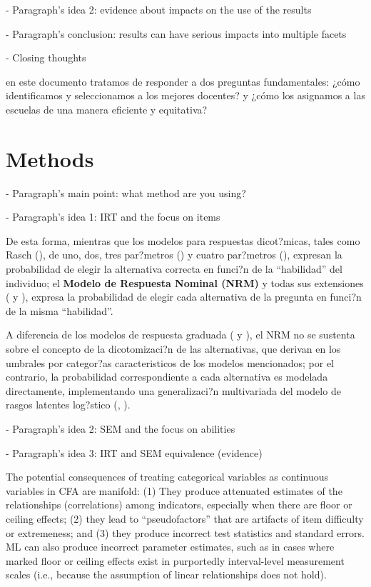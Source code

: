 - Paragraph's idea 2: evidence about impacts on the use of the results


- Paragraph's conclusion: results can have serious impacts into multiple facets




- Closing thoughts

en este documento tratamos de responder a dos preguntas fundamentales: ¿cómo identificamos y seleccionamos a los mejores docentes? y ¿cómo los asignamos a las escuelas de una manera eficiente y equitativa? \citep{Bertoni_et_al_2020b}



\section{Methods}

- Paragraph's main point: what method are you using?


- Paragraph's idea 1: IRT and the focus on items

De esta forma, mientras que los modelos para respuestas dicot?micas, tales como Rasch (\citealp{Rasch1980}), de uno, dos, tres par?metros (\citealp{Lord_Nov2008}) y cuatro par?metros (\citealp{McDonald1967}), expresan la probabilidad de elegir la alternativa correcta en funci?n de la ``habilidad'' del individuo; el \textbf{Modelo de Respuesta Nominal (NRM)} y todas sus extensiones (\citealt{Bock1972}  y \citealt[cap?tulo 2]{Linden1997}), expresa la probabilidad de elegir cada alternativa de la pregunta en funci?n de la misma ``habilidad''.

A diferencia de los modelos de respuesta graduada (\citealt{Samejima1969, Samejima1972} y \citealt[cap?tulo 5]{Ham_Swam1991}), el NRM no se sustenta sobre el concepto de la dicotomizaci?n de las alternativas, que derivan en los umbrales por categor?as caracteristicos de los modelos mencionados; por el contrario, la probabilidad correspondiente a cada alternativa es modelada directamente, implementando una generalizaci?n multivariada del modelo de rasgos latentes log?stico (\citealt{Bock1972}, \citealt{Ostini2006}).



- Paragraph's idea 2: SEM and the focus on abilities




- Paragraph's idea 3: IRT and SEM equivalence (evidence)

\citep{Brown_2015}
The potential consequences of treating categorical variables as continuous variables in CFA are manifold: (1) They produce attenuated estimates of the relationships (correlations) among indicators, especially when there are floor or ceiling effects; (2) they lead to “pseudofactors” that are artifacts of item difficulty or extremeness; and (3) they produce incorrect test statistics and standard errors. ML can also produce  incorrect parameter estimates, such as in cases where marked floor or ceiling effects exist in purportedly interval-level measurement scales (i.e., because the assumption of linear relationships does not hold).



